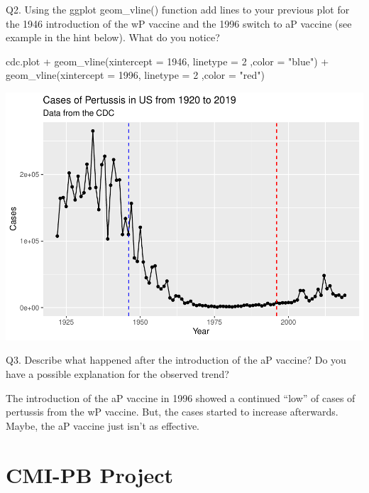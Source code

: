 \documentclass[
]{article}
\newenvironment{Shaded}{\begin{snugshade}}{\end{snugshade}}
\newcommand{\AttributeTok}[1]{\textcolor[rgb]{0.77,0.63,0.00}{#1}}
\newcommand{\DecValTok}[1]{\textcolor[rgb]{0.00,0.00,0.81}{#1}}
\newcommand{\FunctionTok}[1]{\textcolor[rgb]{0.00,0.00,0.00}{#1}}
\newcommand{\NormalTok}[1]{#1}
\newcommand{\SpecialCharTok}[1]{\textcolor[rgb]{0.00,0.00,0.00}{#1}}
\newcommand{\StringTok}[1]{\textcolor[rgb]{0.31,0.60,0.02}{#1}}
\begin{document}
Q2. Using the ggplot geom\_vline() function add lines to your previous
plot for the 1946 introduction of the wP vaccine and the 1996 switch to
aP vaccine (see example in the hint below). What do you notice?

\begin{Shaded}
\begin{Highlighting}[]
\NormalTok{cdc.plot }\SpecialCharTok{+} 
  \FunctionTok{geom\_vline}\NormalTok{(}\AttributeTok{xintercept =} \DecValTok{1946}\NormalTok{, }\AttributeTok{linetype =} \DecValTok{2}\NormalTok{ ,}\AttributeTok{color =} \StringTok{"blue"}\NormalTok{) }\SpecialCharTok{+}
  \FunctionTok{geom\_vline}\NormalTok{(}\AttributeTok{xintercept =} \DecValTok{1996}\NormalTok{, }\AttributeTok{linetype =} \DecValTok{2}\NormalTok{ ,}\AttributeTok{color =} \StringTok{"red"}\NormalTok{)}
\end{Highlighting}
\end{Shaded}

\includegraphics{lab-19-143_files/figure-latex/unnamed-chunk-4-1.pdf}

Q3. Describe what happened after the introduction of the aP vaccine? Do
you have a possible explanation for the observed trend?

The introduction of the aP vaccine in 1996 showed a continued ``low'' of
cases of pertussis from the wP vaccine. But, the cases started to
increase afterwards. Maybe, the aP vaccine just isn't as effective.

\hypertarget{cmi-pb-project}{%
\section{CMI-PB Project}\label{cmi-pb-project}}
\end{document}
